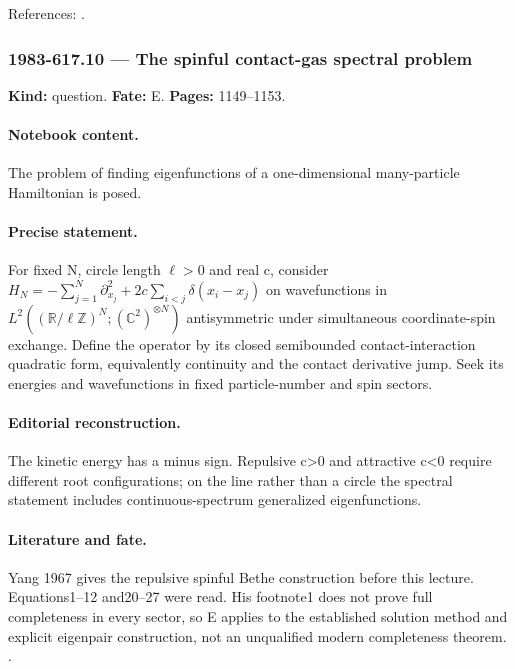 \noindent References: \citep{schwinger1962gauge}.\par

\subsubsection{1983-617.10 --- The spinful contact-gas spectral problem}

\label{item:1983-617.10}

\noindent\textbf{Kind:} question. \textbf{Fate:} E. \textbf{Pages:} 1149--1153.\par

\paragraph{Notebook content.} The problem of finding eigenfunctions of a one-dimensional many-particle Hamiltonian is posed.

\paragraph{Precise statement.} For fixed N, circle length $\ell>0$ and real c, consider $H_N=-\sum_{j=1}^N\partial_{x_j}^2+2c\sum_{i<j}\delta(x_i-x_j)$ on wavefunctions in $L^2((\mathbb R/\ell\mathbb Z)^N;(\mathbb C^2)^{\otimes N})$ antisymmetric under simultaneous coordinate-spin exchange. Define the operator by its closed semibounded contact-interaction quadratic form, equivalently continuity and the contact derivative jump. Seek its energies and wavefunctions in fixed particle-number and spin sectors.

\paragraph{Editorial reconstruction.} The kinetic energy has a minus sign. Repulsive c>0 and attractive c<0 require different root configurations; on the line rather than a circle the spectral statement includes continuous-spectrum generalized eigenfunctions.

\paragraph{Literature and fate.} Yang 1967 gives the repulsive spinful Bethe construction before this lecture. Equations1--12 and20--27 were read. His footnote1 does not prove full completeness in every sector, so E applies to the established solution method and explicit eigenpair construction, not an unqualified modern completeness theorem. \citep{yang1967manybody,yang1968smatrix}.


